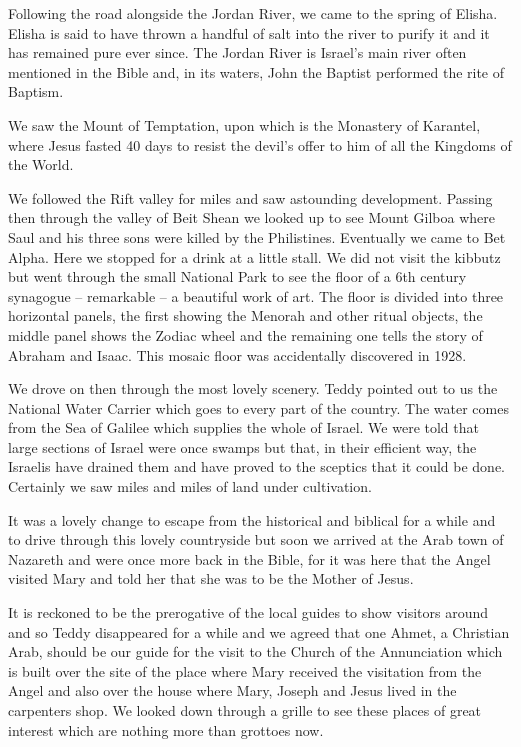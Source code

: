 Following the road alongside the Jordan River, we came to the spring
of Elisha. Elisha is said to have thrown a handful of salt into the
river to purify it and it has remained pure ever since. The Jordan
River is Israel's main river often mentioned in the Bible and, in its
waters, John the Baptist performed the rite of Baptism.

We saw the Mount of Temptation, upon which is the Monastery of
Karantel, where Jesus fasted 40 days to resist the devil's offer to
him of all the Kingdoms of the World.

We followed the Rift valley for miles and saw astounding
development. Passing then through the valley of Beit Shean we looked
up to see Mount Gilboa where Saul and his three sons were killed by
the Philistines. Eventually we came to Bet Alpha. Here we stopped for
a drink at a little stall. We did not visit the kibbutz but went
through the small National Park to see the floor of a 6th century
synagogue -- remarkable -- a beautiful work of art. The floor is
divided into three horizontal panels, the first showing the Menorah
and other ritual objects, the middle panel shows the Zodiac wheel and
the remaining one tells the story of Abraham and Isaac. This mosaic
floor was accidentally discovered in 1928.

We drove on then through the most lovely scenery. Teddy pointed out to
us the National Water Carrier which goes to every part of the
country. The water comes from the Sea of Galilee which supplies the
whole of Israel. We were told that large sections of Israel were once
swamps but that, in their efficient way, the Israelis have drained
them and have proved to the sceptics that it could be done. Certainly
we saw miles and miles of land under cultivation.

It was a lovely change to escape from the historical and biblical for
a while and to drive through this lovely countryside but soon we
arrived at the Arab town of Nazareth and were once more back in the
Bible, for it was here that the Angel visited Mary and told her that
she was to be the Mother of Jesus.

It is reckoned to be the prerogative of the local guides to show
visitors around and so Teddy disappeared for a while and we agreed
that one Ahmet, a Christian Arab, should be our guide for the visit to
the Church of the Annunciation which is built over the site of the
place where Mary received the visitation from the Angel and also over
the house where Mary, Joseph and Jesus lived in the carpenters
shop. We looked down through a grille to see these places of great
interest which are nothing more than grottoes now.

